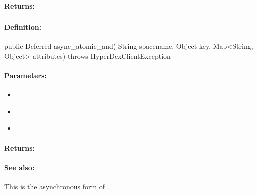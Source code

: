 \paragraph{Returns:}


\pagebreak
\subsubsection{}
\label{api:java:async_atomic_and}


\paragraph{Definition:}
\begin{javacode}
public Deferred async_atomic_and(
        String spacename,
        Object key,
        Map<String, Object> attributes) throws HyperDexClientException
\end{javacode}

\paragraph{Parameters:}
\begin{itemize}[noitemsep]
\item {}\\

\item {}\\

\item {}\\

\end{itemize}

\paragraph{Returns:}


\paragraph{See also:}  This is the asynchronous form of .

\pagebreak
